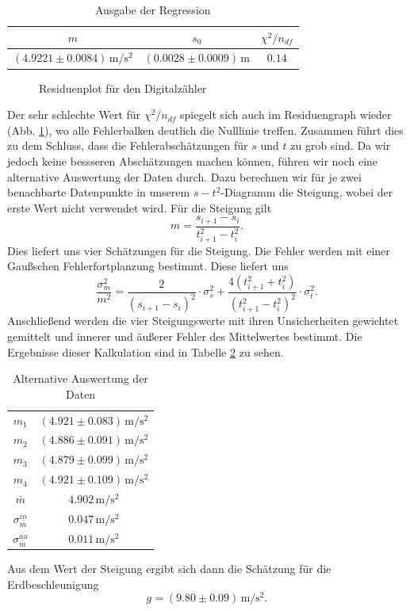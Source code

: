 \documentclass[a4paper, 12pt]{scrartcl}
\begin{document}
\begin{table}[h!]
\begin{center}
\begin{tabular}{c|c|c}
$m$ & $s_0$ & $\chi^2/n_{df}$ \\
\hline
$(4.9221 \pm 0.0084) \, \mathrm m / \mathrm s^2$ & $(0.0028 \pm 0.0009) \, \mathrm m$ & $0.14$
\end{tabular}
\caption{Ausgabe der Regression}
\label{tableReg1}
\end{center}
\end{table}

\begin{figure}[h!]
	\centering
	\caption{Residuenplot für den Digitalzähler}
	\label{ResDz}
\end{figure}

Der sehr schlechte Wert für $\chi^2/n_{df}$ spiegelt sich auch im Residuengraph wieder (Abb. \ref{ResDz}), wo alle Fehlerbalken deutlich die Nulllinie treffen. Zusammen führt dies zu dem Schluss, dass die Fehlerabschätzungen für $s$ und $t$ zu grob sind. Da wir jedoch keine bessseren Abschätzungen machen können, führen wir noch eine alternative Auswertung der Daten durch. Dazu berechnen wir für je zwei benachbarte Datenpunkte in unserem $s-t^2$-Diagramm die Steigung, wobei der erste Wert nicht verwendet wird. Für die Steigung gilt
$$m = \frac{s_{i+1}-s_i}{t_{i+1}^2-t_{i}^2}.$$
Dies liefert uns vier Schätzungen für die Steigung. Die Fehler werden mit einer Gaußschen Fehlerfortplanzung bestimmt. Diese liefert uns
$$\frac{\sigma_m^2}{m^2} = \frac{2}{(s_{i+1}-s_i)^2}\cdot\sigma_s^2 + \frac{4(t_{i+1}^2 + t_i^2)}{(t_{i+1}^2-t_i^2)^2}\cdot\sigma_t^2.$$
Anschließend werden die vier Steigungswerte mit ihren Unsicherheiten gewichtet gemittelt und innerer und äußerer Fehler des Mittelwertes bestimmt. Die Ergebnisse dieser Kalkulation sind in Tabelle \ref{tableAltAus} zu sehen. 

\begin{table}[h!]
\begin{center}
\begin{tabular}{c|c}
$m_1$ & $(4.921 \pm 0.083) \, \mathrm m / \mathrm s^2$ \\ 
$m_2$ & $(4.886 \pm 0.091) \, \mathrm m / \mathrm s^2$ \\
$m_3$ & $(4.879 \pm 0.099) \, \mathrm m / \mathrm s^2$ \\
$m_4$ & $(4.921 \pm 0.109) \, \mathrm m / \mathrm s^2$ \\
\hline
$\bar m$ & $4.902 \, \mathrm m / \mathrm s^2$ \\
$\sigma^{in}_{\bar m}$ & $0.047 \, \mathrm m / \mathrm s^2$ \\
$\sigma^{au}_{\bar m}$ & $0.011 \, \mathrm m / \mathrm s^2$
\end{tabular}
\caption{Alternative Auswertung der Daten}
\label{tableAltAus}
\end{center}
\end{table}
Aus dem Wert der Steigung ergibt sich dann die Schätzung für die Erdbeschleunigung
$$g = (9.80 \pm 0.09) \, \mathrm m / \mathrm s^2 .$$
\end{document}
